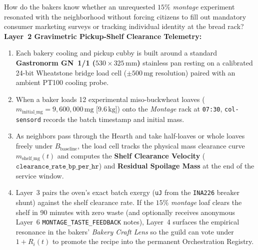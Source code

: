 How do the bakers know whether an unrequested $15\%$ \textit{montage} experiment resonated with the neighborhood without forcing citizens to fill out mandatory consumer marketing surveys or tracking individual identity at the bread rack? \textbf{Layer~2 Gravimetric Pickup-Shelf Clearance Telemetry:}
\begin{enumerate}
    \item Each bakery cooling and pickup cubby is built around a standard \textbf{Gastronorm GN~1/1 ($530 \times 325\,\mathrm{mm}$)} stainless pan resting on a calibrated 24-bit Wheatstone bridge load cell ($\pm 500\,\mathrm{mg}$ resolution) paired with an ambient PT100 cooling probe.
    \item When a baker loads 12 experimental miso-buckwheat loaves ($m_{\mathrm{initial\_mg}} = 9{,}600{,}000\,\mathrm{mg}$ [$9.6\,\mathrm{kg}$]) onto the \textit{Montage} rack at \texttt{07:30}, \texttt{col-sensord} records the batch timestamp and initial mass.
    \item As neighbors pass through the Hearth and take half-loaves or whole loaves freely under $B_{\mathrm{baseline}}$, the load cell tracks the physical mass clearance curve $m_{\mathrm{shelf\_mg}}(t)$ and computes the \textbf{Shelf Clearance Velocity} ($\mathtt{clearance\_rate\_bp\_per\_hr}$) and \textbf{Residual Spoilage Mass} at the end of the service window.
    \item Layer~3 pairs the oven's exact batch exergy (\texttt{uJ} from the \texttt{INA226} breaker shunt) against the shelf clearance rate. If the $15\%$ \textit{montage} loaf clears the shelf in 90 minutes with zero waste (and optionally receives anonymous Layer~6 \texttt{MONTAGE\_TASTE\_FEEDBACK} notes), Layer~4 surfaces the empirical resonance in the bakers' \textit{Bakery Craft Lens} so the guild can vote under $1 + R_i(t)$ to promote the recipe into the permanent Orchestration Registry.
\end{enumerate}


